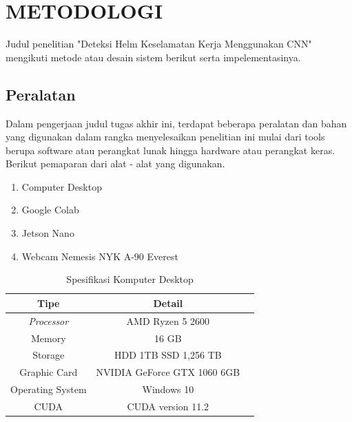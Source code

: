 \chapter{METODOLOGI}
\label{chap:metodologi}


Judul penelitian "Deteksi Helm Keselamatan Kerja Menggunakan CNN" mengikuti metode atau desain sistem berikut serta impelementasinya.


\section{Peralatan}
\label{sec:peralatan}

Dalam pengerjaan judul tugas akhir ini, terdapat beberapa peralatan dan bahan yang digunakan dalam rangka menyelesaikan penelitian ini mulai dari tools berupa software atau perangkat lunak hingga hardware atau perangkat keras. Berikut pemaparan dari alat - alat yang digunakan.


\begin{enumerate}[nolistsep]
  \item Computer Desktop 
  \item Google Colab
  \item Jetson Nano
  \item Webcam Nemesis NYK A-90 Everest
\end{enumerate}


\begin{longtable}{|c|c|c|}
  \caption{Spesifikasi Komputer Desktop}
  \label{tb:spesifikasikomputer}\\
  \hline
  \textbf{Tipe} & \textbf{Detail}  \\
  \hline
  \textit{Processor} & AMD Ryzen 5 2600 \\ 
  Memory             & 16 GB  \\
  Storage            & HDD 1TB SSD 1,256 TB\\
  Graphic Card       & NVIDIA GeForce GTX 1060 6GB \\
  Operating System   & Windows 10     \\
  CUDA               & CUDA version 11.2    \\              
  \hline
\end{longtable}

